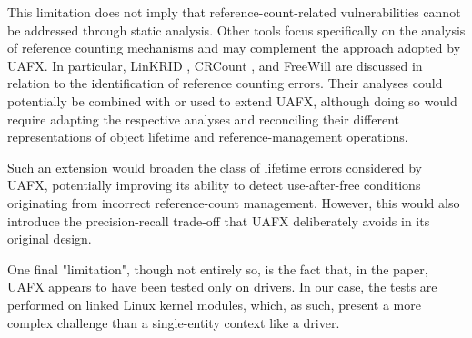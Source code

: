 This limitation does not imply that reference-count-related vulnerabilities cannot be addressed through static analysis. Other tools focus specifically on the analysis of reference counting mechanisms and may complement the approach adopted by UAFX. In particular, LinKRID \cite{bib:linkrid}, CRCount \cite{bib:crcount}, and FreeWill \cite{bib:freewill} are discussed in relation to the identification of reference counting errors. Their analyses could potentially be combined with or used to extend UAFX, although doing so would require adapting the respective analyses and reconciling their different representations of object lifetime and reference-management operations.

Such an extension would broaden the class of lifetime errors considered by UAFX, potentially improving its ability to detect use-after-free conditions originating from incorrect reference-count management. However, this would also introduce the precision-recall trade-off that UAFX deliberately avoids in its original design.

One final "limitation", though not entirely so, is the fact that, in the paper, UAFX appears to have been tested only on drivers. In our case, the tests are performed on linked Linux kernel modules, which, as such, present a more complex challenge than a single-entity context like a driver.